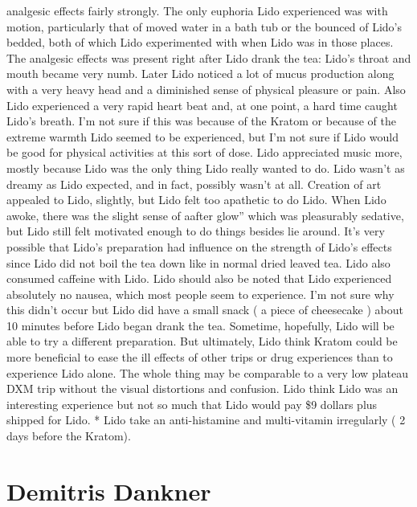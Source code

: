 \documentclass[12pt]{book}
\begin{document}
analgesic effects fairly strongly. The only euphoria Lido experienced was with motion, particularly that of moved water in a bath tub or the bounced of Lido's bedded, both of which Lido experimented with when Lido was in those places. The analgesic effects was present right after Lido drank the tea: Lido's throat and mouth became very numb. Later Lido noticed a lot of mucus production along with a very heavy head and a diminished sense of physical pleasure or pain. Also Lido experienced a very rapid heart beat and, at one point, a hard time caught Lido's breath. I'm not sure if this was because of the Kratom or because of the extreme warmth Lido seemed to be experienced, but I'm not sure if Lido would be good for physical activities at this sort of dose. Lido appreciated music more, mostly because Lido was the only thing Lido really wanted to do. Lido wasn't as dreamy as Lido expected, and in fact, possibly wasn't at all. Creation of art appealed to Lido, slightly, but Lido felt too apathetic to do Lido. When Lido awoke, there was the slight sense of aafter glow'' which was pleasurably sedative, but Lido still felt motivated enough to do things besides lie around. It's very possible that Lido's preparation had influence on the strength of Lido's effects since Lido did not boil the tea down like in normal dried leaved tea. Lido also consumed caffeine with Lido. Lido should also be noted that Lido experienced absolutely no nausea, which most people seem to experience. I'm not sure why this didn't occur but Lido did have a small snack ( a piece of cheesecake ) about 10 minutes before Lido began drank the tea. Sometime, hopefully, Lido will be able to try a different preparation. But ultimately, Lido think Kratom could be more beneficial to ease the ill effects of other trips or drug experiences than to experience Lido alone. The whole thing may be comparable to a very low plateau DXM trip without the visual distortions and confusion. Lido think Lido was an interesting experience but not so much that Lido would pay \$9 dollars plus shipped for Lido. * Lido take an anti-histamine and multi-vitamin irregularly ( 2 days before the Kratom).



\chapter{Demitris Dankner}
\end{document}
